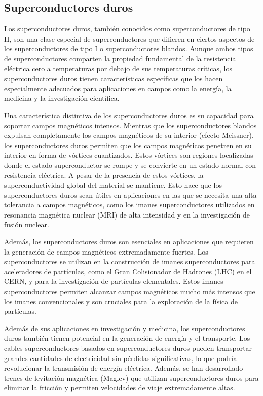 \documentclass[10.5pt]{article}
\begin{document}
    \subsection{Superconductores duros}
    Los superconductores duros, también conocidos como superconductores de tipo II, son una clase especial de superconductores que difieren en ciertos aspectos de los superconductores de tipo I o superconductores blandos. Aunque ambos tipos de superconductores comparten la propiedad fundamental de la resistencia eléctrica cero a temperaturas por debajo de sus temperaturas críticas, los superconductores duros tienen características específicas que los hacen especialmente adecuados para aplicaciones en campos como la energía, la medicina y la investigación científica.

    Una característica distintiva de los superconductores duros es su capacidad para soportar campos magnéticos intensos. Mientras que los superconductores blandos expulsan completamente los campos magnéticos de su interior (efecto Meissner), los superconductores duros permiten que los campos magnéticos penetren en su interior en forma de vórtices cuantizados. Estos vórtices son regiones localizadas donde el estado superconductor se rompe y se convierte en un estado normal con resistencia eléctrica. A pesar de la presencia de estos vórtices, la superconductividad global del material se mantiene. Esto hace que los superconductores duros sean útiles en aplicaciones en las que se necesita una alta tolerancia a campos magnéticos, como los imanes superconductores utilizados en resonancia magnética nuclear (MRI) de alta intensidad y en la investigación de fusión nuclear.

    Además, los superconductores duros son esenciales en aplicaciones que requieren la generación de campos magnéticos extremadamente fuertes. Los superconductores se utilizan en la construcción de imanes superconductores para aceleradores de partículas, como el Gran Colisionador de Hadrones (LHC) en el CERN, y para la investigación de partículas elementales. Estos imanes superconductores permiten alcanzar campos magnéticos mucho más intensos que los imanes convencionales y son cruciales para la exploración de la física de partículas.

    Además de sus aplicaciones en investigación y medicina, los superconductores duros también tienen potencial en la generación de energía y el transporte. Los cables superconductores basados en superconductores duros pueden transportar grandes cantidades de electricidad sin pérdidas significativas, lo que podría revolucionar la transmisión de energía eléctrica. Además, se han desarrollado trenes de levitación magnética (Maglev) que utilizan superconductores duros para eliminar la fricción y permiten velocidades de viaje extremadamente altas.
\end{document}
